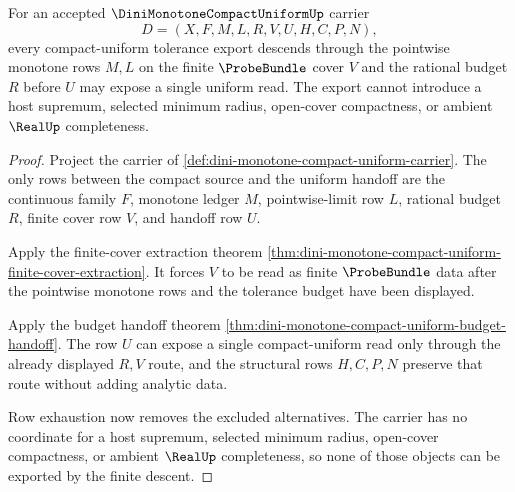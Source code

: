 \begin{theorem}
\label{thm:dini-monotone-compact-uniform-finite-descent}
For an accepted $\DiniMonotoneCompactUniformUp$ carrier
$$
D=(X,F,M,L,R,V,U,H,C,P,N),
$$
every compact-uniform tolerance export descends through the pointwise monotone rows $M,L$ on the finite $\ProbeBundle$ cover $V$ and the rational budget $R$ before $U$ may expose a single uniform read. The export cannot introduce a host supremum, selected minimum radius, open-cover compactness, or ambient $\RealUp$ completeness.
\end{theorem}
\begin{proof}
Project the carrier of \autoref{def:dini-monotone-compact-uniform-carrier}. The only rows between the compact source and the uniform handoff are the continuous family $F$, monotone ledger $M$, pointwise-limit row $L$, rational budget $R$, finite cover row $V$, and handoff row $U$.

Apply the finite-cover extraction theorem \autoref{thm:dini-monotone-compact-uniform-finite-cover-extraction}. It forces $V$ to be read as finite $\ProbeBundle$ data after the pointwise monotone rows and the tolerance budget have been displayed.

Apply the budget handoff theorem \autoref{thm:dini-monotone-compact-uniform-budget-handoff}. The row $U$ can expose a single compact-uniform read only through the already displayed $R,V$ route, and the structural rows $H,C,P,N$ preserve that route without adding analytic data.

Row exhaustion now removes the excluded alternatives. The carrier has no coordinate for a host supremum, selected minimum radius, open-cover compactness, or ambient $\RealUp$ completeness, so none of those objects can be exported by the finite descent.
\end{proof}

